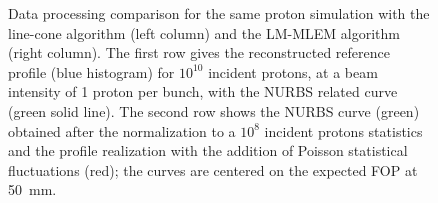 \begin{figure}
  \caption{Data processing comparison for the same proton simulation with the line-cone algorithm (left column) and the LM-MLEM algorithm (right column). The first row gives the reconstructed reference profile (blue histogram) for $10^{10}$ incident protons, at a beam intensity of 1 proton per bunch, with the NURBS related curve (green solid line). The second row shows the NURBS curve (green) obtained after the normalization to a $10^8$ incident protons statistics and the profile realization with the addition of Poisson statistical fluctuations (red); the curves are centered on the expected FOP at 50~mm. }%
\end{figure}

